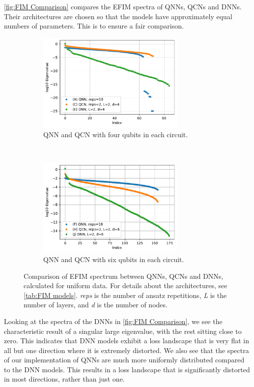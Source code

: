 \autoref{fig:FIM Comparison} compares the EFIM spectra of QNNs, QCNs and DNNs. Their architectures are chosen so that the models have approximately equal numbers of parameters. This is to ensure a fair comparison. 

\begin{figure}[H]
    \centering
    \begin{subfigure}[t]{0.5\textwidth}
        \centering
        \includegraphics[height=1.9in]{latex/figures/FIM_qubits_4.pdf}
        \caption{QNN and QCN with four qubits in each circuit.}
    \end{subfigure}%
    ~ 
    \begin{subfigure}[t]{0.5\textwidth}
        \centering
        \includegraphics[height=1.9in]{latex/figures/FIM_qubits_6.pdf}
        \caption{QNN and QCN with six qubits in each circuit.}
    \end{subfigure}
    \caption{Comparison of EFIM spectrum between QNNs, QCNs and DNNs, calculated for uniform data. For details about the architectures, see \autoref{tab:FIM models}. \emph{reps} is the number of ansatz repetitions, \emph{L} is the number of layers, and \emph{d} is the number of nodes.}
    \label{fig:FIM Comparison}
\end{figure}

Looking at the spectra of the DNNs in \autoref{fig:FIM Comparison}, we see the characteristic result of a singular large eigenvalue, with the rest sitting close to zero. This indicates that DNN models exhibit a loss landscape that is very flat in all but one direction where it is extremely distorted. We also see that the spectra of our implementation of QNNs are much more uniformly distributed compared to the DNN models. This results in a loss landscape that is significantly distorted in most directions, rather than just one. 


